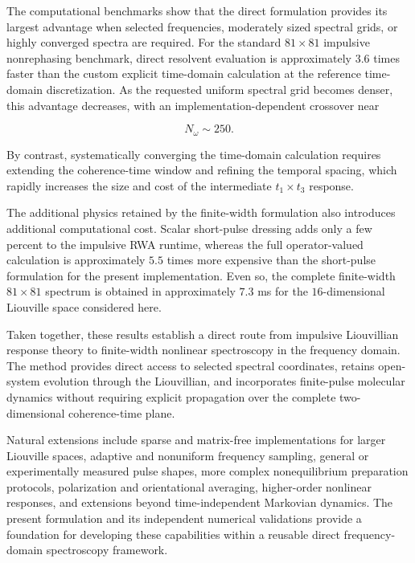 \documentclass[11pt]{article}
\begin{document}
The computational benchmarks show that the direct formulation provides
its largest advantage when selected frequencies, moderately sized
spectral grids, or highly converged spectra are required. For the
standard $81\times81$ impulsive nonrephasing benchmark, direct
resolvent evaluation is approximately $3.6$ times faster than the
custom explicit time-domain calculation at the reference time-domain
discretization. As the requested uniform spectral grid becomes denser,
this advantage decreases, with an implementation-dependent crossover
near

\begin{equation}
N_\omega\sim250.
\end{equation}

By contrast, systematically converging the time-domain calculation
requires extending the coherence-time window and refining the temporal
spacing, which rapidly increases the size and cost of the intermediate
$t_1\times t_3$ response.

The additional physics retained by the finite-width formulation also
introduces additional computational cost. Scalar short-pulse dressing
adds only a few percent to the impulsive RWA runtime, whereas the full
operator-valued calculation is approximately $5.5$ times more
expensive than the short-pulse formulation for the present
implementation. Even so, the complete finite-width
$81\times81$ spectrum is obtained in approximately $7.3$ ms for the
$16$-dimensional Liouville space considered here.

Taken together, these results establish a direct route from impulsive
Liouvillian response theory to finite-width nonlinear spectroscopy in
the frequency domain. The method provides direct access to selected
spectral coordinates, retains open-system evolution through the
Liouvillian, and incorporates finite-pulse molecular dynamics without
requiring explicit propagation over the complete two-dimensional
coherence-time plane.

Natural extensions include sparse and matrix-free implementations for
larger Liouville spaces, adaptive and nonuniform frequency sampling,
general or experimentally measured pulse shapes, more complex
nonequilibrium preparation protocols, polarization and orientational
averaging, higher-order nonlinear responses, and extensions beyond
time-independent Markovian dynamics. The present formulation and its
independent numerical validations provide a foundation for developing
these capabilities within a reusable direct frequency-domain
spectroscopy framework.
\end{document}
